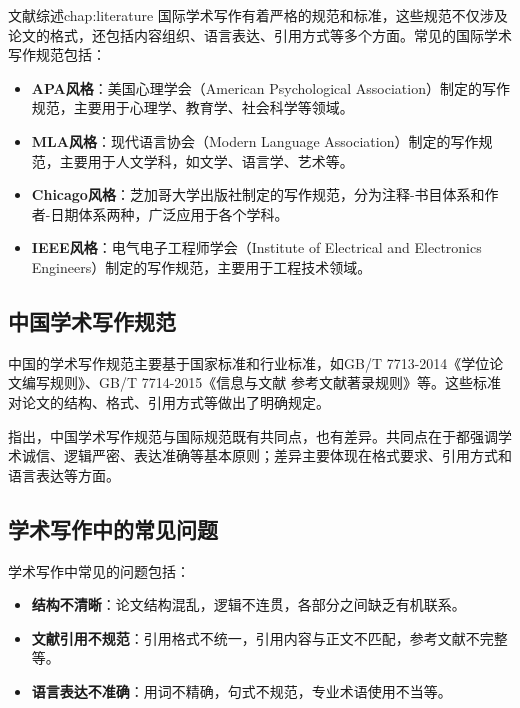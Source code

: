 \begin{cuzchapter}{文献综述}{chap:literature}
	国际学术写作有着严格的规范和标准，这些规范不仅涉及论文的格式，还包括内容组织、语言表达、引用方式等多个方面。常见的国际学术写作规范包括：
	
	\begin{itemize}
		\item \textbf{APA风格}：美国心理学会（American Psychological Association）制定的写作规范，主要用于心理学、教育学、社会科学等领域。
		
		\item \textbf{MLA风格}：现代语言协会（Modern Language Association）制定的写作规范，主要用于人文学科，如文学、语言学、艺术等。
		
		\item \textbf{Chicago风格}：芝加哥大学出版社制定的写作规范，分为注释-书目体系和作者-日期体系两种，广泛应用于各个学科。
		
		\item \textbf{IEEE风格}：电气电子工程师学会（Institute of Electrical and Electronics Engineers）制定的写作规范，主要用于工程技术领域。
	\end{itemize}
	
	\subsection{中国学术写作规范}
	
	中国的学术写作规范主要基于国家标准和行业标准，如GB/T 7713-2014《学位论文编写规则》、GB/T 7714-2015《信息与文献 参考文献著录规则》等。这些标准对论文的结构、格式、引用方式等做出了明确规定。
	
	\citet{chu2004tushu}指出，中国学术写作规范与国际规范既有共同点，也有差异。共同点在于都强调学术诚信、逻辑严密、表达准确等基本原则；差异主要体现在格式要求、引用方式和语言表达等方面。
	
	\subsection{学术写作中的常见问题}
	
	学术写作中常见的问题包括：
	
	\begin{itemize}
		\item \textbf{结构不清晰}：论文结构混乱，逻辑不连贯，各部分之间缺乏有机联系。
		
		\item \textbf{文献引用不规范}：引用格式不统一，引用内容与正文不匹配，参考文献不完整等。
		
		\item \textbf{语言表达不准确}：用词不精确，句式不规范，专业术语使用不当等。
		

\end{itemize}
\end{cuzchapter}
